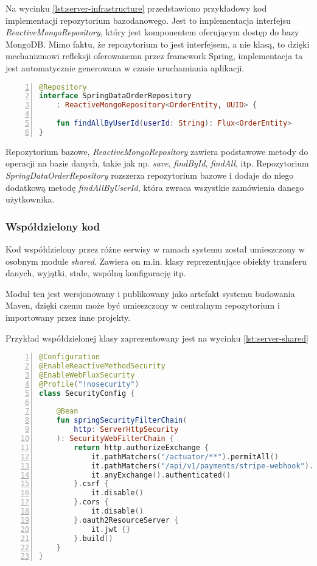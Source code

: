 Na wycinku \ref{lst:server-infrastructure} przedstawiono przykładowy kod implementacji repozytorium bazodanowego. Jest to implementacja interfejsu \textit{ReactiveMongoRepository}, który jest komponentem oferującym dostęp do bazy MongoDB. Mimo faktu, że repozytorium to jest interfejsem, a nie klasą, to dzięki mechanizmowi refleksji oferowanemu przez framework Spring, implementacja ta jest automatycznie generowana w czasie uruchamiania aplikacji.

\begin{lstlisting}[caption={Kod implementacji repozytorium bazodanowego},label={lst:server-infrastructure},captionpos=b,language=Kotlin,numbers=left,showstringspaces=false]
@Repository
interface SpringDataOrderRepository 
    : ReactiveMongoRepository<OrderEntity, UUID> {

    fun findAllByUserId(userId: String): Flux<OrderEntity>
}
\end{lstlisting}

Repozytorium bazowe, \textit{ReactiveMongoRepository} zawiera podstawowe metody do operacji na bazie danych, takie jak np. \textit{save}, \textit{findById}, \textit{findAll}, itp. Repozytorium \textit{SpringDataOrderRepository} rozszerza repozytorium bazowe i dodaje do niego dodatkową metodę \textit{findAllByUserId}, która zwraca wszystkie zamówienia danego użytkownika.

\subsubsection{Współdzielony kod}

Kod współdzielony przez różne serwisy w ramach systemu został umieszczony w osobnym module \textit{shared}. Zawiera on m.in. klasy reprezentujące obiekty transferu danych, wyjątki, stałe, wspólną konfigurację itp.

Moduł ten jest wersjonowany i publikowany jako artefakt systemu budowania Maven, dzięki czemu może być umieszczony w centralnym repozytorium i importowany przez inne projekty.

Przykład współdzielonej klasy zaprezentowany jest na wycinku \ref{lst:server-shared}

\begin{lstlisting}[caption={Kod klasy konfigurującej mechanizm uwierzytelniania i autoryzacji},label={lst:server-shared},captionpos=b,language=Kotlin,numbers=left,showstringspaces=false]
@Configuration
@EnableReactiveMethodSecurity
@EnableWebFluxSecurity
@Profile("!nosecurity")
class SecurityConfig {

    @Bean
    fun springSecurityFilterChain(
        http: ServerHttpSecurity
    ): SecurityWebFilterChain {
        return http.authorizeExchange {
            it.pathMatchers("/actuator/**").permitAll()
            it.pathMatchers("/api/v1/payments/stripe-webhook").permitAll()
            it.anyExchange().authenticated()
        }.csrf {
            it.disable()
        }.cors {
            it.disable()
        }.oauth2ResourceServer {
            it.jwt {}
        }.build()
    }
}
\end{lstlisting}


